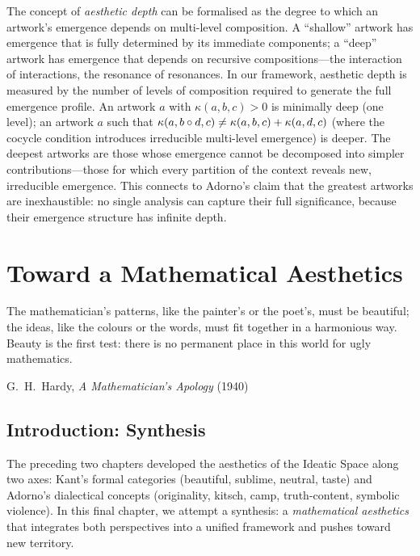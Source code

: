 \begin{remark}
The concept of \emph{aesthetic depth} can be formalised as the degree to which
an artwork's emergence depends on multi-level composition.  A ``shallow''
artwork has emergence that is fully determined by its immediate components;
a ``deep'' artwork has emergence that depends on recursive compositions---the
interaction of interactions, the resonance of resonances.  In our framework,
aesthetic depth is measured by the number of levels of composition required
to generate the full emergence profile.  An artwork $a$ with
$\kappa(a, b, c) > 0$ is minimally deep (one level); an artwork $a$ such
that $\kappa(a, b \circ d, c) \neq \kappa(a, b, c) + \kappa(a, d, c)$
(where the cocycle condition introduces irreducible multi-level emergence) is
deeper.  The deepest artworks are those whose emergence cannot be decomposed
into simpler contributions---those for which every partition of the context
reveals new, irreducible emergence.  This connects to Adorno's claim that the
greatest artworks are inexhaustible: no single analysis can capture their full
significance, because their emergence structure has infinite depth.
\end{remark}



\chapter{Toward a Mathematical Aesthetics}
\label{ch:math-aesthetics}

\epigraph{The mathematician's patterns, like the painter's or the poet's,
must be beautiful; the ideas, like the colours or the words, must fit
together in a harmonious way.  Beauty is the first test: there is no
permanent place in this world for ugly mathematics.}%
{G.\ H.\ Hardy, \emph{A Mathematician's Apology} (1940)}

\section{Introduction: Synthesis}

The preceding two chapters developed the aesthetics of the Ideatic Space
along two axes: Kant's formal categories (beautiful, sublime, neutral,
taste) and Adorno's dialectical concepts (originality, kitsch, camp,
truth-content, symbolic violence).  In this final chapter, we attempt a
synthesis: a \emph{mathematical aesthetics} that integrates both perspectives
into a unified framework and pushes toward new territory.

